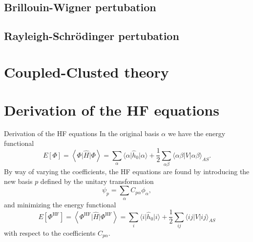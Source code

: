 \documentclass[UKenglish,aspectratio=169]{beamer}
\begin{document}
\subsection{Brillouin-Wigner pertubation}
\subsection{Rayleigh-Schrödinger pertubation}

\section{Coupled-Clusted theory}

\appendix
\section{Derivation of the HF equations}

\begin{frame}{Derivation of the HF equations}
    In the original basis $\alpha$ we have the energy functional
    \begin{equation}
        E[\Phi]
        = \left\langle \Phi \vert \hat{H} \vert \Phi \right\rangle
        = \sum_{\alpha} \langle \alpha \vert \hat{h}_0 \vert \alpha \rangle
        + \frac{1}{2} \sum_{\alpha\beta} \langle \alpha\beta \vert V \vert \alpha \beta \rangle_{AS}.
    \end{equation}
    By way of varying the coefficients, the HF equations are found by introducing the new basis $p$ defined by the unitary transformation
    \begin{equation}
        \psi_p = \sum_{\alpha} C_{p\alpha} \phi_\alpha,
    \end{equation}
    and minimizing the energy functional
    \begin{equation}\label{eq:PhiHF}
        E[\Phi^\mathrm{HF}]
        = \left\langle \Phi^\mathrm{HF} \vert \hat{H} \vert \Phi^\mathrm{HF} \right\rangle
        = \sum_{i} \langle i \vert \hat{h}_0 \vert i \rangle + \frac{1}{2} \sum_{ij} \langle ij \vert V \vert ij \rangle_{AS}
    \end{equation}
    with respect to the coefficients $C_{p\alpha}$.
\end{frame}
\end{document}
